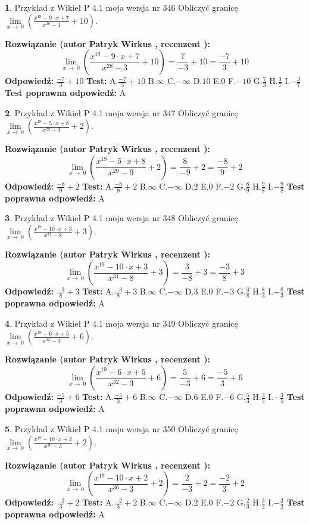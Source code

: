 \documentclass[12pt, a4paper]{article}
\theoremstyle{definition} %
\newtheorem{zad}{}
\newcommand{\zadStart}[1]{\begin{zad}#1\newline}
\newcommand{\zadStop}{\end{zad}}
\newcommand{\rozwStart}[2]{\noindent \textbf{Rozwiązanie (autor #1 , recenzent #2): }\newline}
\newcommand{\rozwStop}{\newline}
\newcommand{\odpStart}{\noindent \textbf{Odpowiedź:}\newline}
\newcommand{\odpStop}{\newline}
\newcommand{\testStart}{\noindent \textbf{Test:}\newline}
\newcommand{\testStop}{\newline}
\newcommand{\kluczStart}{\noindent \textbf{Test poprawna odpowiedź:}\newline}
\newcommand{\kluczStop}{\newline}
\begin{document}
\zadStart{Przykład z Wikieł P 4.1 moja wersja nr 346}
Obliczyć granicę $\lim\limits_{x\to\ 0}(\frac{x^{19}-9 \cdot x +7}{x^{28}-3}+10)$.
\zadStop
\rozwStart{Patryk Wirkus}{}
$$\lim\limits_{x\to\ 0}(\frac{x^{19}-9 \cdot x +7}{x^{28}-3}+10)=\frac{7}{-3}+10=\frac{-7}{3}+10$$
\rozwStop
\odpStart
$\frac{-7}{3}+10$
\odpStop
\testStart
A.$\frac{-7}{3}+10$
B.$\infty$
C.$-\infty$
D.$10$
E.$0$
F.$-10$
G.$\frac{7}{3}$
H.$\frac{3}{7}$
I.$-\frac{3}{7}$
\testStop
\kluczStart
A
\kluczStop



\zadStart{Przykład z Wikieł P 4.1 moja wersja nr 347}
Obliczyć granicę $\lim\limits_{x\to\ 0}(\frac{x^{19}-5 \cdot x +8}{x^{29}-9}+2)$.
\zadStop
\rozwStart{Patryk Wirkus}{}
$$\lim\limits_{x\to\ 0}(\frac{x^{19}-5 \cdot x +8}{x^{29}-9}+2)=\frac{8}{-9}+2=\frac{-8}{9}+2$$
\rozwStop
\odpStart
$\frac{-8}{9}+2$
\odpStop
\testStart
A.$\frac{-8}{9}+2$
B.$\infty$
C.$-\infty$
D.$2$
E.$0$
F.$-2$
G.$\frac{8}{9}$
H.$\frac{9}{8}$
I.$-\frac{9}{8}$
\testStop
\kluczStart
A
\kluczStop



\zadStart{Przykład z Wikieł P 4.1 moja wersja nr 348}
Obliczyć granicę $\lim\limits_{x\to\ 0}(\frac{x^{19}-10 \cdot x +3}{x^{31}-8}+3)$.
\zadStop
\rozwStart{Patryk Wirkus}{}
$$\lim\limits_{x\to\ 0}(\frac{x^{19}-10 \cdot x +3}{x^{31}-8}+3)=\frac{3}{-8}+3=\frac{-3}{8}+3$$
\rozwStop
\odpStart
$\frac{-3}{8}+3$
\odpStop
\testStart
A.$\frac{-3}{8}+3$
B.$\infty$
C.$-\infty$
D.$3$
E.$0$
F.$-3$
G.$\frac{3}{8}$
H.$\frac{8}{3}$
I.$-\frac{8}{3}$
\testStop
\kluczStart
A
\kluczStop



\zadStart{Przykład z Wikieł P 4.1 moja wersja nr 349}
Obliczyć granicę $\lim\limits_{x\to\ 0}(\frac{x^{19}-6 \cdot x +5}{x^{32}-3}+6)$.
\zadStop
\rozwStart{Patryk Wirkus}{}
$$\lim\limits_{x\to\ 0}(\frac{x^{19}-6 \cdot x +5}{x^{32}-3}+6)=\frac{5}{-3}+6=\frac{-5}{3}+6$$
\rozwStop
\odpStart
$\frac{-5}{3}+6$
\odpStop
\testStart
A.$\frac{-5}{3}+6$
B.$\infty$
C.$-\infty$
D.$6$
E.$0$
F.$-6$
G.$\frac{5}{3}$
H.$\frac{3}{5}$
I.$-\frac{3}{5}$
\testStop
\kluczStart
A
\kluczStop



\zadStart{Przykład z Wikieł P 4.1 moja wersja nr 350}
Obliczyć granicę $\lim\limits_{x\to\ 0}(\frac{x^{19}-10 \cdot x +2}{x^{36}-3}+2)$.
\zadStop
\rozwStart{Patryk Wirkus}{}
$$\lim\limits_{x\to\ 0}(\frac{x^{19}-10 \cdot x +2}{x^{36}-3}+2)=\frac{2}{-3}+2=\frac{-2}{3}+2$$
\rozwStop
\odpStart
$\frac{-2}{3}+2$
\odpStop
\testStart
A.$\frac{-2}{3}+2$
B.$\infty$
C.$-\infty$
D.$2$
E.$0$
F.$-2$
G.$\frac{2}{3}$
H.$\frac{3}{2}$
I.$-\frac{3}{2}$
\testStop
\kluczStart
A
\kluczStop
\end{document}
